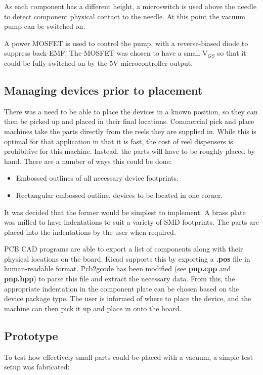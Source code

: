 As each component has a different height, a microswitch is used above
the needle to detect component physical contact to the needle. At this
point the vacuum pump can be switched on.

A power MOSFET is used to control the pump, with a reverse-biased
diode to suppress back-EMF. The MOSFET was chosen to have a small V$_{GS}$
so that it could be fully switched on by the 5V microcontroller output.


\subsection{Managing devices prior to placement}
There was a need to be able to place the devices in a known position, so they can then be picked up and placed in their final locations.
Commercial pick and place machines take the parts directly from the reels they are supplied in. While this is optimal for that application in that
it is fast, the cost of reel dispensers is prohibitive for this machine. Instead, the parts will have to be roughly placed
by hand. There are a number of ways this could be done:

\begin{itemize} \itemsep0em
	\item	Embossed outlines of all necessary device footprints.
	\item	Rectangular embossed outline, devices to be located in one corner.
\end{itemize}

It was decided that the former would be simplest to implement. A
brass plate was milled to have indentations to suit a variety of SMD
footprints. The parts are placed into the indentations by the user
when required.

PCB CAD programs are able to export a list of components along with their
physical locations on the board. Kicad supports this by exporting a \textbf{.pos}
file in human-readable format. Pcb2gcode has been modified (see \textbf{pnp.cpp}
and \textbf{pnp.hpp}) to parse this file and extract the necessary data.
From this, the appropriate indentation in the component plate can be 
chosen based on the device package type. The user is informed of where
to place the device, and the machine can then pick it up and place in onto
the board.

\subsection{Prototype}
To test how effectively small parts could be placed with a vacuum, a simple test setup was fabricated:

